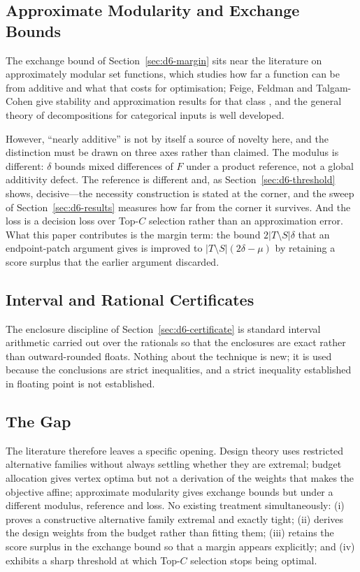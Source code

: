 \documentclass[conference]{IEEEtran}
\theoremstyle{definition}
\begin{document}
\subsection{Approximate Modularity and Exchange Bounds}

The exchange bound of Section~\ref{sec:d6-margin} sits near the literature on approximately
modular set functions, which studies how far a function can be from additive and what that
costs for optimisation; Feige, Feldman and Talgam-Cohen give stability and approximation
results for that class \cite{feige2020}, and the general theory of decompositions for
categorical inputs is well developed.

However, ``nearly additive'' is not by itself a source of novelty here, and the distinction
must be drawn on three axes rather than claimed. The modulus is different: $\delta$ bounds
mixed differences of $F$ under a product reference, not a global additivity defect. The
reference is different and, as Section~\ref{sec:d6-threshold} shows, decisive---the necessity
construction is stated at the corner, and the sweep of Section~\ref{sec:d6-results} measures how
far from the corner it survives. And the loss is a decision loss over
Top-$C$ selection rather than an approximation error. What this paper contributes is the
margin term: the bound $2|T\setminus S|\delta$ that an endpoint-patch argument gives is
improved to $|T\setminus S|(2\delta-\mu)$ by retaining a score surplus that the earlier
argument discarded.

\subsection{Interval and Rational Certificates}

The enclosure discipline of Section~\ref{sec:d6-certificate} is standard interval arithmetic
\cite{moore2009} carried out over the rationals so that the enclosures are exact rather than
outward-rounded floats. Nothing about the technique is new; it is used because the
conclusions are strict inequalities, and a strict inequality established in floating point is
not established.

\subsection{The Gap}

The literature therefore leaves a specific opening. Design theory uses restricted alternative
families without always settling whether they are extremal; budget allocation gives vertex
optima but not a derivation of the weights that makes the objective affine; approximate
modularity gives exchange bounds but under a different modulus, reference and loss. No
existing treatment simultaneously: (i) proves a constructive alternative family extremal and
exactly tight; (ii) derives the design weights from the budget rather than fitting them;
(iii) retains the score surplus in the exchange bound so that a margin appears explicitly;
and (iv) exhibits a sharp threshold at which Top-$C$ selection stops being optimal.
\end{document}
